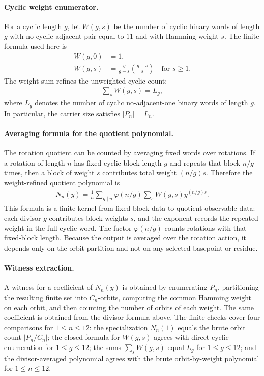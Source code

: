 \paragraph{Cyclic weight enumerator.}
For a cyclic length $g$, let $W(g,s)$ be the number of cyclic binary words of length $g$ with no cyclic adjacent pair equal to $11$ and with Hamming weight $s$.  The finite formula used here is
$$
\begin{aligned}
 W(g,0)&=1,\\
 W(g,s)&=\frac{g}{g-s}\binom{g-s}{s}\quad\text{for }s\geq 1.
\end{aligned}
$$
The weight sum refines the unweighted cyclic count:
$$
\begin{aligned}
 \sum_s W(g,s)=L_g,
\end{aligned}
$$
where $L_g$ denotes the number of cyclic no-adjacent-one binary words of length $g$.  In particular, the carrier size satisfies $|P_n|=L_n$.

\paragraph{Averaging formula for the quotient polynomial.}
The rotation quotient can be counted by averaging fixed words over rotations.  If a rotation of length $n$ has fixed cyclic block length $g$ and repeats that block $n/g$ times, then a block of weight $s$ contributes total weight $(n/g)s$.  Therefore the weight-refined quotient polynomial is
$$
\begin{aligned}
 N_n(y)=\frac{1}{n}\sum_{g\mid n}\varphi(n/g)\sum_s W(g,s)y^{(n/g)s}.
\end{aligned}
$$
This formula is a finite kernel from fixed-block data to quotient-observable data: each divisor $g$ contributes block weights $s$, and the exponent records the repeated weight in the full cyclic word.  The factor $\varphi(n/g)$ counts rotations with that fixed-block length.  Because the output is averaged over the rotation action, it depends only on the orbit partition and not on any selected basepoint or residue.

\paragraph{Witness extraction.}
A witness for a coefficient of $N_n(y)$ is obtained by enumerating $P_n$, partitioning the resulting finite set into $C_n$-orbits, computing the common Hamming weight on each orbit, and then counting the number of orbits of each weight.  The same coefficient is obtained from the divisor formula above.  The finite checks cover four comparisons for $1\leq n\leq 12$: the specialization $N_n(1)$ equals the brute orbit count $|P_n/C_n|$; the closed formula for $W(g,s)$ agrees with direct cyclic enumeration for $1\leq g\leq 12$; the sums $\sum_s W(g,s)$ equal $L_g$ for $1\leq g\leq 12$; and the divisor-averaged polynomial agrees with the brute orbit-by-weight polynomial for $1\leq n\leq 12$.

